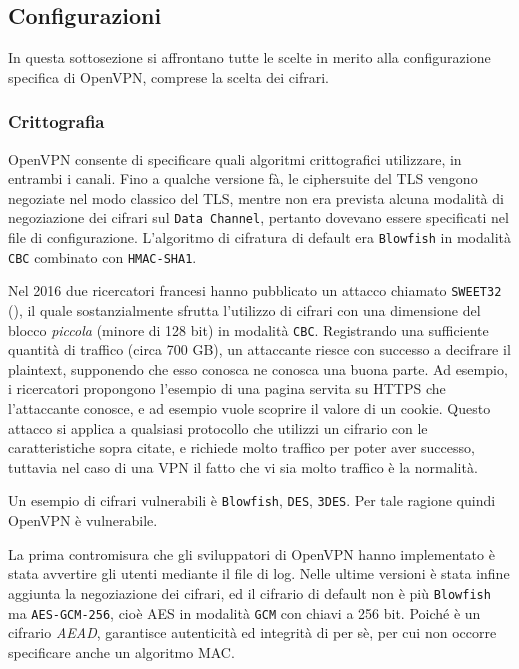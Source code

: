 \subsection{Configurazioni}
In questa sottosezione si affrontano tutte le scelte in merito alla configurazione
specifica
di OpenVPN, comprese la scelta dei cifrari.

\subsubsection{Crittografia}
OpenVPN consente di specificare quali algoritmi crittografici utilizzare, in entrambi i canali.
Fino a qualche versione fà, le ciphersuite del TLS vengono negoziate nel
modo classico del TLS, mentre non era prevista alcuna modalità di negoziazione
dei cifrari sul \texttt{Data Channel}, pertanto dovevano essere specificati
nel file di configurazione. L'algoritmo di cifratura di default era \texttt{Blowfish}
in modalità \texttt{CBC} combinato con \texttt{HMAC-SHA1}.

Nel 2016 due ricercatori francesi hanno pubblicato un attacco chiamato \texttt{SWEET32} (\cite{sweet32}),
il quale sostanzialmente sfrutta l'utilizzo di cifrari con una dimensione del blocco
\textit{piccola} (minore di 128 bit) in modalità \texttt{CBC}. Registrando
una sufficiente quantità di traffico (circa 700 GB), un attaccante riesce con successo
a decifrare il plaintext, supponendo che esso conosca ne conosca una buona parte.
Ad esempio, i ricercatori propongono l'esempio di una pagina servita su HTTPS che l'attaccante
conosce, e ad esempio vuole scoprire il valore di un cookie. Questo attacco si applica
a qualsiasi protocollo che utilizzi un cifrario con le caratteristiche sopra citate, e richiede
molto traffico per poter aver successo, tuttavia nel caso di una VPN il fatto che
vi sia molto traffico è la normalità.

Un esempio di cifrari vulnerabili è \texttt{Blowfish}, \texttt{DES}, \texttt{3DES}.
Per tale ragione quindi OpenVPN è vulnerabile.


La prima contromisura che gli sviluppatori di OpenVPN hanno implementato è stata
avvertire gli utenti mediante il file di log. Nelle ultime versioni è stata infine
aggiunta la negoziazione dei cifrari, ed il cifrario di default non è più
\texttt{Blowfish} ma \texttt{AES-GCM-256}, cioè AES in modalità \texttt{GCM} con
chiavi a 256 bit. Poiché è un cifrario \textit{AEAD}, garantisce autenticità ed
integrità di per sè, per cui non occorre specificare anche un algoritmo MAC.

